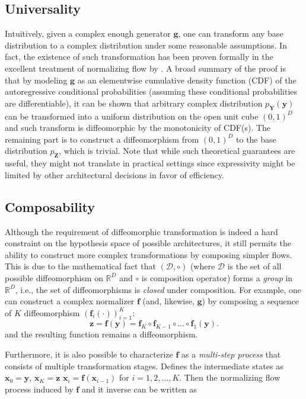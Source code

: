 \subsection{Universality}
\label{f:uni}

Intuitively, given a complex enough generator $\mathbf{g}$, one can transform
any base distribution to a complex distribution under some reasonable
assumptions. In fact, the existence of such transformation has been proven
formally in the excellent treatment of normalizing flow by
\citep{papamakariosNormalizingFlowsProbabilistic2021}. A broad summary of the
proof is that by modeling $\mathbf{g}$ as an elementwise cumulative density
function (CDF) of the autoregressive conditional probabilities (assuming these
conditional probabilities are differentiable), it can be shown that arbitrary
complex distribution $p_{\mathbf{Y}}(\mathbf{y})$ can be transformed into a
uniform distribution on the open unit cube $(0,1)^D$ and such transform is
diffeomorphic by the monotonicity of CDF(s). The remaining part is to construct
a diffeomorphism from $(0,1)^D$ to the base distribution $p_{\mathbf{Z}}$, which
is trivial. Note that while such theoretical guarantees are useful, they might
not translate in practical settings since expressivity might be limited by other
architectural decisions in favor of efficiency.

\subsection{Composability}
\label{f:comp}

Although the requirement of diffeomorphic transformation is indeed a hard
constraint on the hypothesis space of possible architectures, it still permits the
ability to construct more complex transformations by composing
simpler flows. This is due to the mathematical fact that $(\mathcal{D}, \circ)$
(where $\mathcal{D}$ is
the set of all possible diffeomorphism on $\mathbb{R}^D$ and $\circ$ is
composition operator) forms a \textit{group} in $\mathbb{R}^D$, i.e., the set of
diffeomorphisms is \textit{closed} under composition. For example, one can
construct a complex normalizer $\mathbf{f}$ (and, likewise, $\mathbf{g}$) by composing a sequence of
$K$ diffeomorphism $(\mathbf{f}_i(\cdot))_{i=1}^K$:
$$
\mathbf{z} = \mathbf{f}(\mathbf{y}) = \mathbf{f}_K \circ \mathbf{f}_{K-1} \circ \ldots \circ \mathbf{f}_1
(\mathbf{y})
.$$
and the resulting function remains a diffeomorphism.

Furthermore, it is also possible to characterize $\mathbf{f}$ as a
\textit{multi-step process} that consists of multiple transformation stages.
Defines the intermediate states as $\mathbf{x}_0 = \mathbf{y}$, $\mathbf{x}_K =
\mathbf{z}$ $\mathbf{x}_i = \mathbf{f}(\mathbf{x}_{i-1})$ for $i=1,2, \ldots,
K$. Then the normalizing flow process induced by $\mathbf{f}$ and it inverse can
be written as

